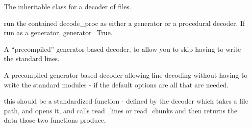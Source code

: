 \documentclass[letterpaper,10pt,english]{sphinxmanual}
\begin{document}
\begin{fulllineitems}
\label{classes:pyodec.core.FileDecoder}
The inheritable class for a decoder of files.

\begin{fulllineitems}
\label{classes:pyodec.core.FileDecoder.decode}
run the contained decode\_proc as either a generator or a procedural decoder. 
If run as a generator, generator=True.

\end{fulllineitems}


\begin{fulllineitems}
\label{classes:pyodec.core.FileDecoder.decode_chunks}
A ``precompiled'' generator-based decoder, to allow you to skip
having to write the standard lines.

\end{fulllineitems}


\begin{fulllineitems}
\label{classes:pyodec.core.FileDecoder.decode_lines}
A precompiled generator-based decoder allowing line-decoding without having
to write the standard modules - if the default options are all that are needed.

\end{fulllineitems}


\begin{fulllineitems}
\label{classes:pyodec.core.FileDecoder.decode_proc}
this should be a standardized function - defined by the decoder
which takes a file path, and opens it, and calls read\_lines or read\_chunks
and then returns the data those two functions produce.


\end{fulllineitems}
\end{fulllineitems}
\end{document}
